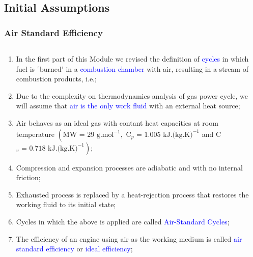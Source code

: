 \documentclass[10pt,compress]{beamer}
\begin{document}
\subsection{Initial Assumptions}
\begin{frame}
 \frametitle{Air Standard Efficiency}
   \begin{columns}
     \begin{column}[c]{0.5\linewidth}
       \begin{enumerate} \scriptsize
         \item<1-> In the first part of this Module we revised the definition of \textcolor{blue}{cycles} in which fuel is $\lq$burned' in a \textcolor{blue}{combustion chamber} with air, resulting in a stream of combustion products, i.e.;
         \item<2-> Due to the complexity on thermodynamics analysis of gas power cycle, we will assume that \textcolor{blue}{air is the only work fluid} with an external heat source;
         \item<3-> Air behaves as an ideal gas with contant heat capacities at room temperature $\left(\text{MW = 29 g.mol}^{-1},\text{ C}_{p}\text{ = 1.005 kJ.(kg.K)}^{-1}\right.$ and C$\left._{v}\text{ = 0.718 kJ.(kg.K)}^{-1}\right)$;
         \item<4-> Compression and expansion processes are adiabatic and with no internal friction;
         \item<5-> Exhausted process is replaced by a heat-rejection process that restores the working fluid to its initial state;
         \item<6-> Cycles in which the above is applied are called \textcolor{blue}{Air-Standard Cycles};
         \item<7-> The efficiency of an engine using air as the working medium is called \textcolor{blue}{air standard efficiency} or \textcolor{blue}{ideal efficiency};
       \end{enumerate}
     \end{column}  
     \begin{column}[c]{0.5\linewidth}
\end{column}
\end{columns}
\end{frame}
\end{document}
